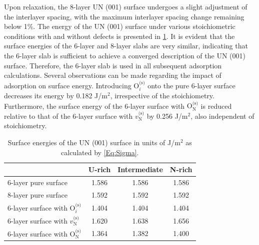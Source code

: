 \documentclass[preprint,12pt,sort&compress]{elsarticle}
\newcommand{\?}{\stackrel{?}{=}}
\begin{document}
Upon relaxation, the 8-layer UN (001) surface undergoes a slight adjustment of the interlayer spacing, with the maximum interlayer spacing change remaining below 1\%. The energy of the UN (001) surface under various stoichiometric conditions with and without defects is presented in \cref{Tab:SurfE}. It is evident that the surface energies of the 6-layer and 8-layer slabs are very similar, indicating that the 6-layer slab is sufficient to achieve a converged description of the UN (001) surface. Therefore, the 6-layer slab is used in all subsequent adsorption calculations. Several observations can be made regarding the impact of adsorption on surface energy. Introducing $\text{O}_i^{\text{(s)}}$ onto the pure 6-layer surface decreases its energy by 0.182 J/m$^2$, irrespective of the stoichiometry. Furthermore, the surface energy of the 6-layer surface with $\text{O}_\text{N}^{\text{(s)}}$ is reduced relative to that of the 6-layer surface with $v_\text{N}^{\text{(s)}}$ by 0.256 J/m$^2$, also independent of stoichiometry.

\begin{table}[h!]
\centering
\caption{Surface energies of the UN (001) surface in units of J/m$^2$ as calculated by \cref{Eq:Sigma}.}
\footnotesize
\begin{tabular}{lccc}
\hline
 & U-rich & Intermediate & N-rich \\
\hline
6-layer pure surface & 1.586 & 1.586 & 1.586 \\
8-layer pure surface  & 1.592 & 1.592 & 1.592 \\
6-layer surface with O$_i^\text{(s)}$ & 1.404 & 1.404 & 1.404 \\
6-layer surface with $v_\text{N}^\text{(s)}$ & 1.620 & 1.638 & 1.656 \\
6-layer surface with O$_\text{N}^\text{(s)}$ & 1.364 & 1.382 & 1.400 \\
\hline
\end{tabular}
\label{Tab:SurfE}
\end{table}
\end{document}

